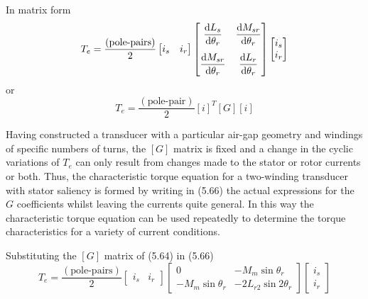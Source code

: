 \documentclass[a4paper,numbers=noenddot,12pt]{scrbook}
\begin{document}
            In matrix form
            \begin{equation}
                T_e = \frac{(\text{pole-pairs})}{2}
                \begin{bmatrix}
                    i_s & i_r
                \end{bmatrix}
                \begin{bmatrix}
                    \dfrac{\dif L_s}{\dif \theta_r} & \dfrac{\dif M_{sr}}{\dif \theta_r} \\[3ex] 
                    \dfrac{\dif M_{sr}}{\dif \theta_r} & \dfrac{\dif L_{r}}{\dif \theta_r} 
                \end{bmatrix}
                \begin{bmatrix}
                    i_s \\ i_r
                \end{bmatrix}
            \end{equation}
            or
            \begin{equation}
                T_e = \frac{(\text{pole-pair})}{2}{[i]}^T[G][i] %
            \end{equation}

            Having constructed a transducer with a particular air-gap geometry and windings of specific numbers of turns, the $[G]$ matrix is fixed and a change in the cyclic variations of $T_e$ can only result from changes made to the stator or rotor currents or both. Thus, the characteristic torque equation for a two-winding transducer with stator saliency is formed by writing in (5.66) the actual expressions for the $G$ coefficients whilst leaving the currents quite general. In this way the characteristic torque equation can be used repeatedly to determine the torque characteristics for a variety of current conditions.

            Substituting the $[G]$ matrix of (5.64) in (5.66)
            \begin{equation}
                T_e = \frac{(\text{pole-pairs})}{2}
                \begin{bmatrix}
                    i_s & i_r
                \end{bmatrix}
                \begin{bmatrix}
                    0 & -M_m\sin\theta_r \\ 
                    - M_m \sin \theta_r & -2 L_{r2} \sin 2 \theta_r
                \end{bmatrix}
                \begin{bmatrix}
                    i_s \\ i_r
                \end{bmatrix}
            \end{equation}
\end{document}
